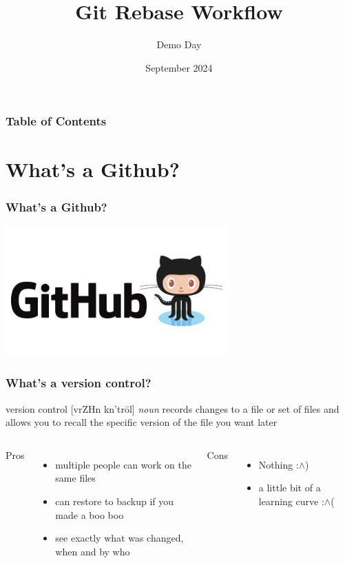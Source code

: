 \documentclass{beamer}
\title[Git Rebase Workflow] %
{Git Rebase Workflow}
\subtitle{Demo Day}
\date[KS 2024] %
{September 2024}
\begin{document}
\frame{\titlepage}


\begin{frame}
\frametitle{Table of Contents}
\tableofcontents
\end{frame}

\section{What's a Github?}
\begin{frame}
\frametitle{What's a Github?}
\begin{center}
    \includegraphics[height=5cm]{pictures/github.jpg}
\end{center}
\end{frame}


\begin{frame}
\frametitle{What's a version control?}
\begin{block}{version control [v\textschwa rZH\textschwa n k\textschwa n'trōl] \textit{noun}}
records changes to a file or set of files and allows you to recall the specific version of the file you want later
\end{block}


    \pause \begin{columns}[T]
    Pros
    \begin{itemize}
    \item multiple people can work on the same files  
    \item can restore to backup if you made a boo boo
    \item see exactly what was changed, when and by who
    \end{itemize}
    \pause Cons
    \begin{itemize}
    \item Nothing :$\wedge$)
    \pause \item a little bit of a learning curve :$\wedge$(
    \end{itemize}
  \end{columns}

\end{frame}
\end{document}
